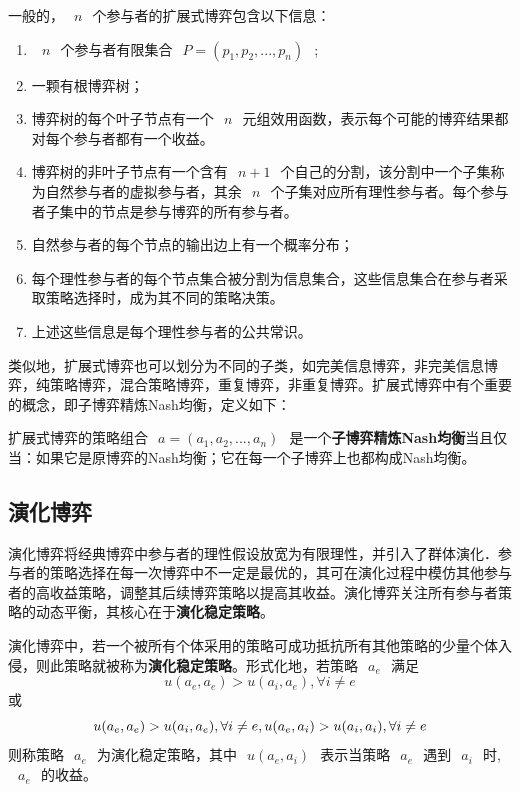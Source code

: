 \begin{definition}
一般的，~$~n~$~个参与者的扩展式博弈包含以下信息：
\begin{enumerate}
	\item ~$~n~$~个参与者有限集合~$~P=(p_1,p_2,...,p_n)~$~;
	\item 一颗有根博弈树；
	\item 博弈树的每个叶子节点有一个~$~n~$~元组效用函数，表示每个可能的博弈结果都对每个参与者都有一个收益。
	\item 博弈树的非叶子节点有一个含有~$~n+1~$~个自己的分割，该分割中一个子集称为自然参与者的虚拟参与者，其余~$~n~$~个子集对应所有理性参与者。每个参与者子集中的节点是参与博弈的所有参与者。
	
	\item 自然参与者的每个节点的输出边上有一个概率分布；
	\item 每个理性参与者的每个节点集合被分割为信息集合，这些信息集合在参与者采取策略选择时，成为其不同的策略决策。
	\item 上述这些信息是每个理性参与者的公共常识。
\end{enumerate}
\end{definition}

类似地，扩展式博弈也可以划分为不同的子类，如完美信息博弈，非完美信息博弈，纯策略博弈，混合策略博弈，重复博弈，非重复博弈。扩展式博弈中有个重要的概念，即子博弈精炼Nash均衡，定义如下：
\begin{definition}
扩展式博弈的策略组合~$~a=(a_1,a_2,...,a_n)~$~是一个\textbf{子博弈精炼Nash均衡}当且仅当：如果它是原博弈的Nash均衡；它在每一个子博弈上也都构成Nash均衡。
\end{definition}
\subsection{演化博弈}

演化博弈将经典博弈中参与者的理性假设放宽为有限理性，并引入了群体演化．参与者的策略选择在每一次博弈中不一定是最优的，其可在演化过程中模仿其他参与者的高收益策略，调整其后续博弈策略以提高其收益。演化博弈关注所有参与者策略的动态平衡，其核心在于\textbf{演化稳定策略}。

\begin{definition}
	演化博弈中，若一个被所有个体采用的策略可成功抵抗所有其他策略的少量个体入侵，则此策略就被称为\textbf{演化稳定策略}。形式化地，若策略~$~a_e~$~满足
	\begin{equation}
	u(a_e,a_e) > u(a_i,a_e), \forall i \ne e 
	\end{equation}
	或
	\begin{equation}
	u(a_e,a_e) > u(a_i,a_e), \forall i \ne e,\\
	u(a_e,a_i) > u(a_i,a_i), \forall i \ne e 
	\end{equation}
	则称策略~$~a_e~$~为演化稳定策略，其中~$~u(a_e,a_i)~$~表示当策略~$~a_e~$~遇到~$~a_i~$~时, ~$~a_e~$~的收益。
	
\end{definition}


